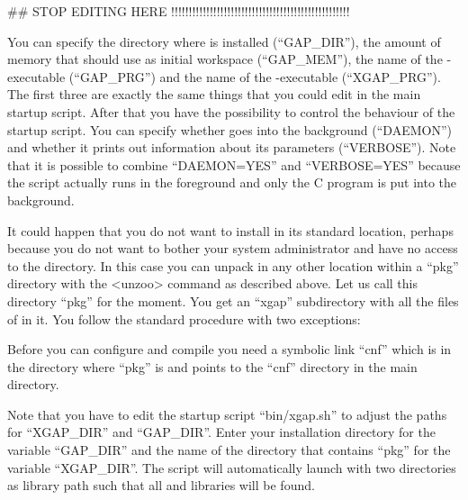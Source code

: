 \begintt
##  STOP EDITING HERE !!!!!!!!!!!!!!!!!!!!!!!!!!!!!!!!!!!!!!!!!!!!!!!!!!!
\endtt

You can specify the directory where {\GAP} is installed (``GAP\_DIR''), 
the amount of memory that {\GAP} should use as initial workspace
(``GAP\_MEM''), the name of the {\GAP}-executable (``GAP\_PRG'') and the
name of the {\XGAP}-executable (``XGAP\_PRG''). The first three are exactly 
the same things that you could edit in the main {\GAP} startup script.
After that you have the possibility to control the behaviour of the {\XGAP}
startup script. You can specify whether {\XGAP} goes into the background
(``DAEMON'') and whether it prints out information about its parameters
(``VERBOSE''). Note that it is possible to combine ``DAEMON=YES''
and ``VERBOSE=YES'' because the script actually runs in the foreground and
only the C program is put into the background.



It could happen that you do not want to install {\XGAP} in its
standard location, perhaps because you do not want to bother your
system administrator and have no access to the {\GAP} directory. In
this case you can unpack {\XGAP} in any other location within a
``pkg'' directory with the <unzoo> command as described above. Let us
call this directory ``pkg'' for the moment. You get an ``xgap''
subdirectory with all the files of {\XGAP} in it. You follow the
standard procedure with two exceptions:

Before you can configure and compile {\XGAP} you need a symbolic link
``cnf'' which is in the directory where ``pkg'' is and points to the ``cnf''
directory in the main {\GAP} directory.

Note that you have to edit the startup script ``bin/xgap.sh'' to
adjust the paths for ``XGAP_DIR'' and ``GAP_DIR''.  Enter your {\GAP}
installation directory for the variable ``GAP_DIR'' and the name of
the directory that contains ``pkg'' for the variable ``XGAP_DIR''. The
script will automatically launch {\GAP} with two directories as
library path such that all {\GAP} and {\XGAP} libraries will be found.

